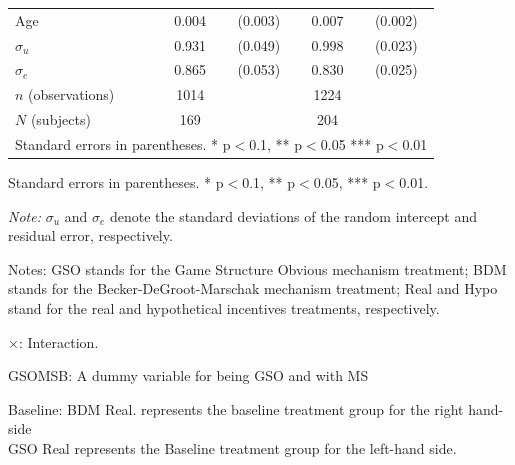 \documentclass[12pt]{article}
\newcommand{\sym}[1]{\rlap{$^{#1}$}}
\begin{document}
\begin{table}[H]
{\begin{tabular}{l*{2}{cc}}
Age         &       0.004         &     (0.003)&       0.007\sym{***}&     (0.002)\\
$\sigma_u$     &       0.931\sym{***}&     (0.049)&       0.998\sym{***}&     (0.023)\\
$\sigma_e$     &       0.865\sym{***}&     (0.053)&       0.830\sym{***}&     (0.025)\\
\hline
\(n\) (observations)       &        1014         &            &        1224         &            \\
\(N\) (subjects)      &        169         &            &        204         &            \\
\hline \hline
\multicolumn{5}{l}{\footnotesize Standard errors in parentheses. * p$<$0.1, ** p$<$0.05 *** p$<$0.01}\\
\end{tabular}
}



\begin{tablenotes}
            \footnotesize
            \item Standard errors in parentheses. * p$<$0.1, ** p$<$0.05, *** p$<$0.01.
            \item \textit{Note:} $\sigma_u$ and $\sigma_e$ denote the standard deviations of the random intercept and residual error, respectively.
            \item Notes: GSO stands for the Game Structure Obvious mechanism treatment; BDM stands for the Becker-DeGroot-Marschak mechanism treatment; Real and Hypo stand for the real and hypothetical incentives treatments, respectively.
           \item $\times$: Interaction.
           \item GSOMSB: A dummy variable for being GSO and with MS
           \item Baseline: BDM Real. represents the baseline treatment group for the right hand-side \\
           GSO Real represents the Baseline treatment group for the left-hand side.
        \end{tablenotes}
\end{table}



\clearpage
\end{document}
